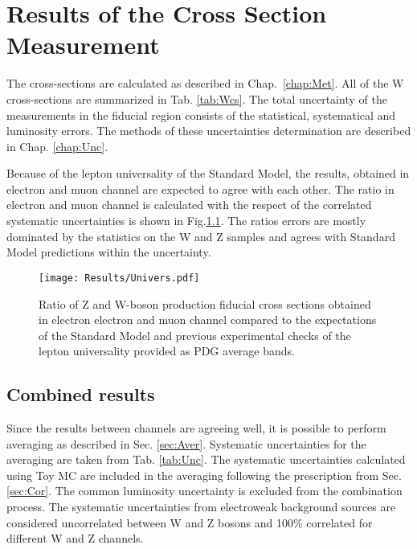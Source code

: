 \chapter{Results of the Cross Section Measurement}
The cross-sections are calculated as described in Chap.~\ref{chap:Met}. All of the W cross-sections are summarized in Tab. \ref{tab:Wcs}.  The total uncertainty of the measurements in the fiducial region consists of the statistical, systematical and luminosity errors. The methods of these uncertainties determination are described in Chap. \ref{chap:Unc}.

Because of the lepton universality of the Standard Model, the results, obtained in electron and muon channel are expected to agree with each other. The ratio in electron and muon channel is calculated with the respect of the correlated systematic uncertainties is shown in Fig.\ref{fig:LeptUnivers}. The ratios errors are mostly dominated by the statistics on the W and Z samples and agrees with Standard Model predictions within the uncertainty.

\begin{figure}[!b]
\begin{center}
\begin{minipage}[h]{0.8\linewidth}
\texttt{[image: Results/Univers.pdf]}
\end{minipage}
\caption{Ratio of Z and W-boson production fiducial cross sections obtained in electron electron and muon channel compared to the expectations of the Standard Model and previous experimental checks of the lepton universality provided as PDG average bands.}
\label{fig:LeptUnivers}
\end{center}
\end{figure}


\section{Combined results}

Since the results between channels are agreeing well, it is possible to perform averaging as described in Sec. \ref{sec:Aver}. Systematic uncertainties for the averaging are taken from Tab. \ref{tab:Unc}. The systematic uncertainties calculated using Toy MC are included in the averaging following the prescription from Sec. \ref{sec:Cor}. The common luminosity uncertainty is excluded from the combination process. The systematic uncertainties from electroweak background sources are considered uncorrelated between W and Z bosons and 100\% correlated for different W and Z channels.

